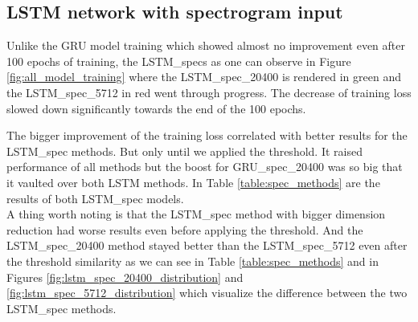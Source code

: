 \subsection{LSTM network with spectrogram input}\label{ssec:LSTM_spec_results}

Unlike the GRU model training which showed almost no improvement even after 100 epochs of training, the LSTM\_specs as one can observe in Figure \ref{fig:all_model_training} where the LSTM\_spec\_20400 is rendered in green and the LSTM\_spec\_5712 in red went through progress. The decrease of training loss slowed down significantly towards the end of the 100 epochs.

The bigger improvement of the training loss correlated with better results for the LSTM\_spec methods. But only until we applied the threshold. It raised performance of all methods but the boost for GRU\_spec\_20400 was so big that it vaulted over both LSTM methods. In Table \ref{table:spec_methods} are the results of both LSTM\_spec models. \\
A thing worth noting is that the LSTM\_spec method with bigger dimension reduction had worse results even before applying the threshold. And the LSTM\_spec\_20400 method stayed better than the LSTM\_spec\_5712 even after the threshold similarity as we can see in Table \ref{table:spec_methods} and in Figures \ref{fig:lstm_spec_20400_distribution} and \ref{fig:lstm_spec_5712_distribution} which visualize the difference between the two LSTM\_spec methods.


